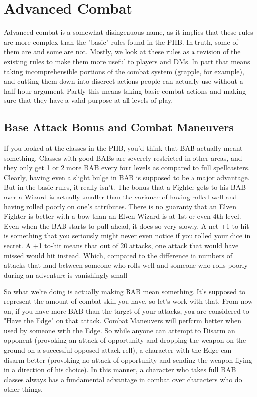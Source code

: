 
\section{Advanced Combat}

Advanced combat is a somewhat disingenuous name, as it implies that these rules are more complex than the "basic" rules found in the PHB. In truth, some of them are and some are not. Mostly, we look at these rules as a revision of the existing rules to make them more useful to players and DMs. In part that means taking incomprehensible portions of the combat system (grapple, for example), and cutting them down into discreet actions people can actually use without a half-hour argument. Partly this means taking basic combat actions and making sure that they have a valid purpose at all levels of play.

\subsection{Base Attack Bonus and Combat Maneuvers}

If you looked at the classes in the PHB, you'd think that BAB actually meant something. Classes with good BABs are severely restricted in other areas, and they only get 1 or 2 more BAB every four levels as compared to full spellcasters. Clearly, having even a slight bulge in BAB is supposed to be a major advantage. But in the basic rules, it really isn't. The bonus that a Fighter gets to his BAB over a Wizard is actually smaller than the variance of having rolled well and having rolled poorly on one's attributes. There is no guaranty that an Elven Fighter is better with a bow than an Elven Wizard is at 1st or even 4th level. Even when the BAB starts to pull ahead, it does so very slowly. A net +1 to-hit is something that you seriously might never even notice if you rolled your dice in secret. A +1 to-hit means that out of 20 attacks, one attack that would have missed would hit instead. Which, compared to the difference in numbers of attacks that land between someone who rolls well and someone who rolls poorly during an adventure is vanishingly small.

So what we're doing is actually making BAB mean something. It's supposed to represent the amount of combat skill you have, so let's work with that. From now on, if you have more BAB than the target of your attacks, you are considered to "Have the Edge" on that attack. Combat Maneuvers will perform better when used by someone with the Edge. So while anyone can attempt to Disarm an opponent (provoking an attack of opportunity and dropping the weapon on the ground on a successful opposed attack roll), a character with the Edge can disarm better (provoking no attack of opportunity and sending the weapon flying in a direction of his choice). In this manner, a character who takes full BAB classes always has a fundamental advantage in combat over characters who do other things.

